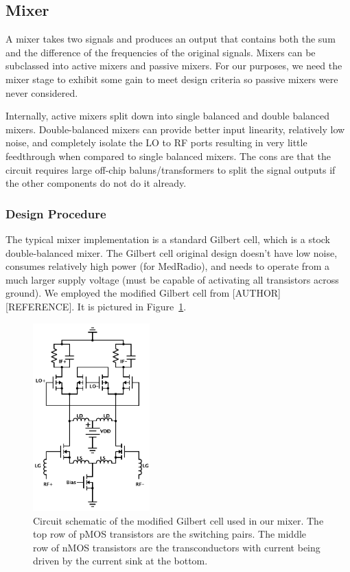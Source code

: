 \subsection{Mixer}

A mixer takes two signals and produces an output that contains both the sum and the difference of the frequencies of the original signals. Mixers can be subclassed into active mixers and passive mixers. For our purposes, we need the mixer stage to exhibit some gain to meet design criteria so passive mixers were never considered. 

Internally, active mixers split down into single balanced and double balanced mixers. Double-balanced mixers can provide better input linearity, relatively low noise, and completely isolate the LO to RF ports resulting in very little feedthrough when compared to single balanced mixers. The cons are that the circuit requires large off-chip baluns/transformers to split the signal outputs if the other components do not do it already. 

\subsubsection{Design Procedure}
The typical mixer implementation is a standard Gilbert cell, which is a stock double-balanced mixer. The Gilbert cell original design doesn't have low noise, consumes relatively high power (for MedRadio), and needs to operate from a much larger supply voltage (must be capable of activating all transistors across ground). We employed the modified Gilbert cell from [AUTHOR] [REFERENCE]. It is pictured in Figure~\ref{fig:mixer}. 

\begin{figure}[h]
   \centering
    \includegraphics[width=0.40\textwidth]{figures/Mixer.pdf}
    \caption{
        Circuit schematic of the modified Gilbert cell used in our mixer. The top row of pMOS transistors are the switching pairs. The middle row of nMOS transistors are the transconductors with current being driven by the current sink at the bottom.
    }
    \label{fig:mixer}
\end{figure}

